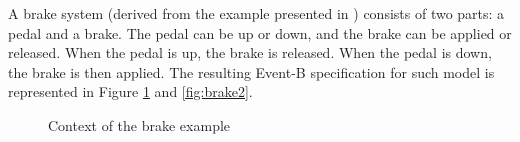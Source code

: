 \begin{example}
\normalfont
A brake system (derived from the example presented in \cite{Aouadhi2017}) consists of two parts: a pedal and a brake. The pedal can be up or down, and the brake can be applied or released. When the pedal is up, the brake is released. When the pedal is down, the brake is then applied. The resulting Event-B specification for such model is represented in Figure \ref{fig:brake1} and \ref{fig:brake2}.
\begin{figure}[H]
    \centering
    \caption{Context of the brake example}
    \label{fig:brake1}
\end{figure}
\begin{figure}[H]
    \centering

\end{figure}
\end{example}
